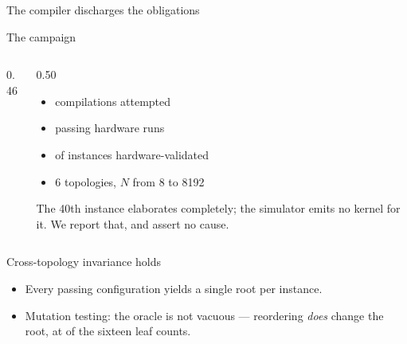 \documentclass[aspectratio=169,10pt]{beamer}
\begin{document}
\begin{frame}{The compiler discharges the obligations}
\end{frame}

\begin{frame}{The campaign}
\begin{columns}[T]
\begin{column}{0.46\textwidth}
\end{column}
\begin{column}{0.50\textwidth}\small
\begin{itemize}\small
  \item \CampAttempted{} compilations attempted
  \item \CampPassing{} passing hardware runs
  \item \TournNInst{} of \SuiteSize{} instances hardware-validated
  \item 6 topologies, $N$ from 8 to 8192
\end{itemize}
\vspace{4pt}
The 40th instance elaborates completely; the simulator emits no kernel for it.
We report that, and assert no cause.
\end{column}
\end{columns}
\end{frame}

\begin{frame}{Cross-topology invariance holds}
\begin{itemize}
  \item Every passing configuration yields a single root per instance.
  \item Mutation testing: the oracle is not vacuous --- reordering
        \emph{does} change the root, at \OrderLRDiff{} of the sixteen leaf counts.
\end{itemize}
\vspace{6pt}
\end{frame}
\end{document}
